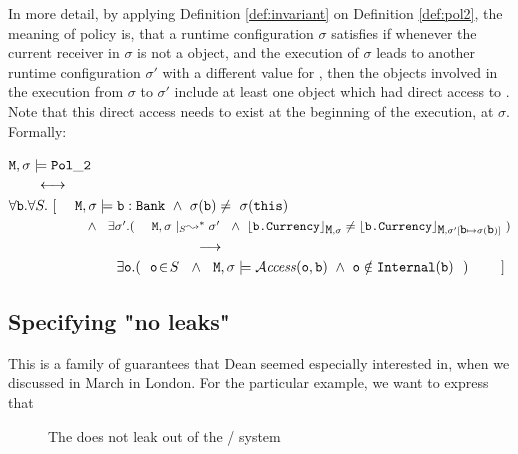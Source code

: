 \documentclass[acmsmall,screen]{acmart}
\begin{document}
In more detail, by applying  Definition \ref{def:invariant} on Definition \ref{def:pol2}, the  meaning of policy 
  is, that a runtime configuration $\sigma$ satisfies    if whenever the current receiver in $\sigma$
 is not a  object, and the execution of $\sigma$ leads to another runtime configuration $\sigma'$
 with a different value for , then the objects involved in the execution from
 $\sigma$ to $\sigma'$ include at least one object which had direct access to .
 Note that this direct access needs to exist at the beginning of   the execution, \ie at $\sigma$.
 Formally:

 \noindent
 ${\mbox{\tt{M}}}, \sigma \models  {\ensuremath{{\mbox{\tt{Pol}}}\_{{\mbox{\tt{2}}}}}}$\\$ \strut \ \ \ \  \ \  \longleftrightarrow $\\
 $\forall {\mbox{\tt{b}}}.\forall S.\ [ \ \ \ \ {\mbox{\tt{M}}}, \sigma \models {\mbox{\tt{b}}}:{\mbox{\tt{Bank}}}\ \wedge\
 \sigma({\mbox{\tt{b}}})\neq \ \sigma({\mbox{\tt{this}}}) $\\
 $\strut \hspace{2.1cm}  \wedge \
 \ \exists\sigma'.(\ \ \ \ {\mbox{\tt{M}}}, \sigma\mid_S \leadsto^* \sigma'\
\ \wedge\ {\lfloor{ {{\mbox{\tt{b.Currency}}}}}\rfloor_{{\mbox{\tt{M}}},\sigma}}\neq {\ensuremath{\lfloor{ {{\mbox{\tt{b.Currency}}}}}\rfloor_{{\mbox{\tt{M}}},\sigma'[{\mbox{\tt{b}}}\mapsto\sigma({\mbox{\tt{b}}})]}}}\ )$\\
$\strut \hspace{4.7cm} \longrightarrow$ \\
 $\strut \hspace{2.7cm}  %
 \exists \prg{o}. (\ \ \prg{o} \!\in\!S\ \
  \wedge \ \ \M, \sigma \models \CanAccess{\prg{o}}{\prg{b} }\ \wedge \  \prg{o}\notin \prg{Internal}(\prg{b}) \   \ ) \ \ \ \ \ \ \  ]$



\subsection{Specifying  "no leaks"}

This is a family of guarantees that Dean seemed especially interested in, when we discussed in March in London.
For the particular example, we want to express that

\begin{description}
\item[\Pol 7]
The  does not leak out of the \prg{Bank}/ system
\end{description}
\end{document}
